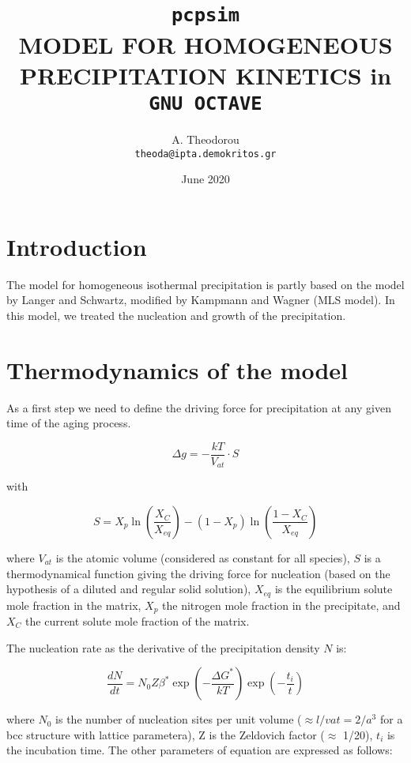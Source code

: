 \documentclass[12pt,a4paper]{article}
\author{
  A. Theodorou\\
  \texttt{theoda@ipta.demokritos.gr}

}
\date{June 2020}
\title{\texttt{pcpsim} \\ 
MODEL FOR HOMOGENEOUS PRECIPITATION KINETICS in \texttt{GNU OCTAVE}
}
\begin{document}
\maketitle

\section{Introduction}
The model for homogeneous isothermal precipitation is partly based on the model by Langer and Schwartz, modified by Kampmann and Wagner (MLS model). In this model, we treated the nucleation and growth of the precipitation.


\section{Thermodynamics of the model}

As a first step we need to define the driving force for precipitation at any given time of the aging process.
 
\begin{equation}
\Delta g = - \frac{kT}{V_{at}} \cdot S 
\end{equation}

with

\begin{equation}
S =  X_p \ln(\frac{X_C}{X_{eq}} ) - (1 - X_p) \ln(\frac{1 - X_C}{X_{eq}}) 
\end{equation}

where $V_{at}$ is the atomic volume (considered as constant for all species), $S$ is a thermodynamical  function giving the driving force for nucleation (based
on the hypothesis of a diluted and regular solid solution), $X_{eq}$ is the equilibrium solute mole fraction in the matrix, $X_p$ the nitrogen mole fraction in the precipitate, and $X_C$ the current solute mole fraction of the matrix.

The nucleation rate as the derivative of the precipitation density $N$ is:

\begin{equation}
\label{P_density}
\frac{d N}{d t} = N_0 Z \beta^* \exp(-\frac{\Delta G^*}{kT}) \exp(-\frac{t_i}{t})
\end{equation}

where $N_0$ is the number of nucleation sites per unit volume ($\approx  l/vat =2/a^3$ for a bcc structure with lattice parametera), Z is the Zeldovich factor ($\approx$ 1/20), $t_i$ is the incubation time. The other parameters of equation are expressed as follows:
\end{document}
